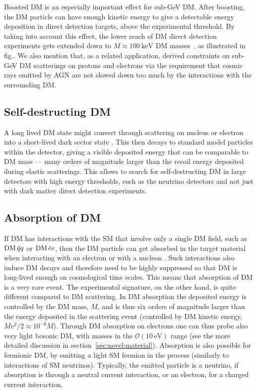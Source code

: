 Boosted DM is an especially important effect for sub-GeV DM. After boosting, the DM particle can have enough kinetic energy to give
a detectable energy deposition in direct detection targets,  above the experimental threshold.
By taking into account this effect, the lower reach of DM direct detection experiments 
gets extended down to $M\approx 100 \ \text{keV}$ DM masses~\cite{Boosted:DM:exp},
as illustrated in fig..
We also mention that, as a related application,  derived constraints on sub-GeV DM scatterings on protons and electrons via the requirement that cosmic rays emitted by AGN are not slowed down too much by the interactions with the surrounding DM.



\subsection{Self-destructing DM}
A long lived DM state might convert through scattering on nucleus or electron into a short-lived dark sector state \cite{Self:destr:DM}. 
This then decays to standard model particles within the detector, giving a visible deposited energy  that can be comparable to DM mass --- 
many orders of magnitude larger than the recoil energy deposited during elastic scatterings. 
This allows to search for self-destructing DM in large detectors with high energy thresholds, 
such as the neutrino detectors and not just with dark matter direct detection experiments. 




\subsection{Absorption of DM}
If DM has interactions with the SM that involve only a single DM field, such as ${\rm DM}\,\bar q q$ or ${\rm DM}\,\bar e e$, 
then the DM particle can get absorbed in the target material when interacting with an electron or with a nucleon \cite{absorption:DM}. 
Such interactions also induce DM decays and therefore need to be highly suppressed so that DM is long-lived enough on cosmological time scales. 
This means that absorption of DM is a very rare event. The experimental signature, on the other hand, is quite different compared to DM scattering. 
In DM absorption the deposited energy is controlled by the DM mass, $M$, and is thus six orders of magnitude larger than the  energy 
deposited in the scattering event (controlled by DM kinetic energy, $ M v^2/2\approx 10^{-6} M$). 
Through DM absorption on electrons one can thus probe also very light bosonic DM, with masses in the ${\mathcal O}(10\,\text{eV})$ range 
(see the more detailed discussion in section~\ref{sec:novel:material}).
Absorption is also possible for fermionic DM, by emitting a light SM fermion in the process (similarly to interactions of SM neutrinos).
Typically, the emitted particle is a neutrino, if absorption  is through a neutral current interaction, or an electron, for a charged current interaction. 



